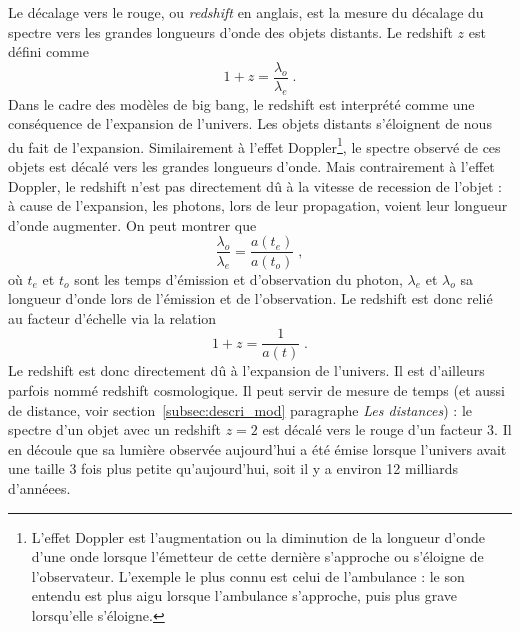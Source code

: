 \documentclass[11pt, twoside, a4paper, openright]{report}
\begin{document}
Le décalage vers le rouge, ou \emph{redshift} en anglais, est la mesure du décalage du spectre vers les grandes longueurs d'onde des objets distants. Le redshift $z$ est défini comme 
\begin{equation}
  \label{eq:redshift}
  1 + z = \frac{\lambda_o}{\lambda_e}  \; .
\end{equation}
Dans le cadre des modèles de big bang, le redshift est interprété comme une conséquence de l'expansion de l'univers.
Les objets distants s'éloignent de nous du fait de l'expansion. Similairement à l'effet Doppler\footnote{L'effet Doppler est l'augmentation ou la diminution de la longueur d'onde d'une onde lorsque l'émetteur de cette dernière s'approche ou s'éloigne de l'observateur. L'exemple le plus connu est celui de l'ambulance : le son entendu est plus aigu lorsque l'ambulance s'approche, puis plus grave lorsqu'elle s'éloigne.}, le spectre observé de ces objets est décalé vers les grandes longueurs d'onde.
Mais contrairement à l'effet Doppler, le redshift n'est pas directement dû à la vitesse de recession de l'objet :
à cause de l'expansion, les photons, lors de leur propagation, voient leur longueur d'onde augmenter.
On peut montrer que
\begin{equation}
  \frac{\lambda_o}{\lambda_e} = \frac{a(t_e)}{a(t_o)}  \; ,
\end{equation}
où $t_e$ et $t_o$ sont les temps d'émission et d'observation du photon, $\lambda_{e}$  et $\lambda_{o}$ sa longueur d'onde lors de l'émission et de l'observation. Le redshift est donc relié au facteur d'échelle via la relation
\begin{equation}
  \label{eq:redshift2}
  1 + z = \frac{1}{a(t)} \; .
\end{equation} 
Le redshift est donc directement dû à l'expansion de l'univers. Il est d'ailleurs parfois nommé redshift cosmologique. Il peut servir de mesure de temps (et aussi de distance, voir section~\ref{subsec:descri_mod} paragraphe \emph{Les distances}) : le spectre d'un objet avec un redshift $z=2$ est décalé vers le rouge d'un facteur 3. Il en découle que sa lumière observée aujourd'hui a été émise lorsque l'univers avait une taille 3 fois plus petite qu'aujourd'hui, soit il y a environ 12 milliards d'annéees.
\end{document}
